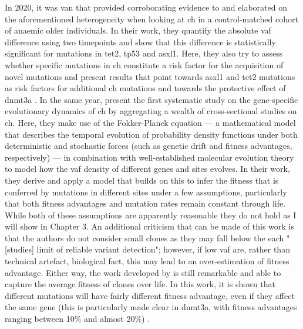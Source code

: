 In 2020, it was van  that provided corroborating evidence to and elaborated on the aforementioned heterogeneity when looking at \ac{ch} in a control-matched cohort of anaemic older individuals. In their work, they quantify the absolute \ac{vaf} difference using two timepoints and show that this difference is statistically significant for mutations in \ac{tet2}, \ac{tp53} and \ac{asxl1}. Here, they also try to assess whether specific mutations in \ac{ch} constitute a risk factor for the acquisition of novel mutations and present results that point towards \ac{asxl1} and \ac{tet2} mutations as risk factors for additional \ac{ch} mutations and towards the protective effect of \ac{dnmt3a} \cite{Van_Zeventer2020-pw}. In the same year,  present the first systematic study on the gene-specific evolutionary dynamics of \ac{ch} by aggregating a wealth of cross-sectional studies on \ac{ch}. Here, they make use of the Fokker-Planck equation --- a mathematical model that describes the temporal evolution of probability density functions under both deterministic and stochastic forces (such as genetic drift and fitness advantages, respectively) --- in combination with well-established molecular evolution theory to model how the \ac{vaf} density of different genes and sites evolves. In their work, they derive and apply a model that builds on this to infer the fitness that is conferred by mutations in different sites under a few assumptions, particularly that both fitness advantages and mutation rates remain constant through life. While both of these assumptions are apparently reasonable they do not hold as I will show in Chapter 3. An additional criticism that can be made of this work is that the authors do not consider small clones as they may fall below the each "[studies] limit of reliable variant detection"; however, if low \ac{vaf} are, rather than technical artefact, biological fact, this may lead to an over-estimation of fitness advantage. Either way, the work developed by  is still remarkable and able to capture the average fitness of clones over life. In this work, it is shown that different mutations will have fairly different fitness advantage, even if they affect the same gene (this is particularly made clear in \ac{dnmt3a}, with fitness advantages ranging between 10\% and almost 20\%) \cite{Watson2020-pz}.


